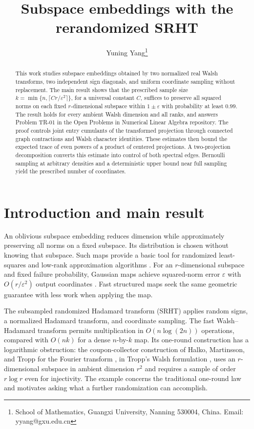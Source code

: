 \documentclass[11pt]{article}
\title{Subspace embeddings with the rerandomized SRHT}
\author{Yuning Yang\thanks{School of Mathematics, Guangxi University, Nanning 530004, China. Email: yyang@gxu.edu.cn}}
\date{}
\theoremstyle{definition}
\theoremstyle{remark}
\theoremstyle{plain}
\begin{document}
\maketitle

\begin{abstract}
This work studies subspace embeddings obtained by two normalized real Walsh
transforms, two independent sign diagonals, and uniform coordinate
sampling without replacement. The main result shows that the prescribed sample size
$k=\min\{n,\lceil Cr/\varepsilon^2\rceil\}$, for a universal constant $C$,
suffices to preserve all squared norms on each fixed $r$-dimensional
subspace within $1\pm\varepsilon$ with probability at least $0.99$.
The result holds for every ambient Walsh dimension and all ranks,
and answers Problem TR-01 in the Open Problems in Numerical Linear
Algebra repository.
The proof controls joint entry cumulants of the transformed projection
through connected graph contractions and Walsh character identities.
These estimates then bound the expected trace of even powers of a product of
centered projections. A two-projection decomposition converts this
estimate into control of both spectral edges. Bernoulli sampling at arbitrary
densities and a deterministic upper bound near full sampling yield the
prescribed number of coordinates.
\end{abstract}

\section{Introduction and main result}\label{sec:introduction}

An oblivious subspace embedding reduces dimension while approximately
preserving all norms on a fixed subspace. Its distribution is chosen
without knowing that subspace. Such maps provide a basic tool for
randomized least-squares and low-rank approximation algorithms
\cite{hmt,boutsidis_gittens}. For an $r$-dimensional subspace and fixed
failure probability, Gaussian maps achieve squared-norm error
$\varepsilon$ with $O(r/\varepsilon^2)$ output coordinates
\cite[Section~1]{nelson_nguyen}.
Fast structured maps seek the same geometric guarantee with less
work when applying the map.

The subsampled randomized Hadamard transform (SRHT) applies random
signs, a normalized Hadamard transform, and coordinate sampling.
The fast Walsh--Hadamard transform permits multiplication in
$O(n\log(2n))$ operations, compared with $O(nk)$ for a dense
$n$-by-$k$ map. Its one-round construction has a logarithmic
obstruction: the coupon-collector construction of
Halko, Martinsson, and Tropp for the Fourier transform
\cite[Remark~11.2]{hmt}, in Tropp's Walsh formulation
\cite[Section~3.3]{tropp_srht}, uses an $r$-dimensional subspace in ambient dimension $r^2$
and requires a sample of order $r\log r$ even for injectivity.
The example concerns the traditional one-round law and motivates
asking what a further randomization can accomplish.
\end{document}
